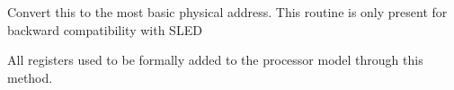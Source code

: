 
\begin{DoxyRefList}
\item[Member \mbox{\hyperlink{class_address_a5dfb849ac01e7b1ca87d0ecbf5022dca}{Address::to\+Physical}} (void)]\label{deprecated__deprecated000001}%
%
Convert this to the most basic physical address. This routine is only present for backward compatibility with S\+L\+ED  
\item[Member \mbox{\hyperlink{class_translate_a2614aefa5c03a9f1ed0b2dba794cad2c}{Translate::add\+Register}} (const string \&nm, \mbox{\hyperlink{class_addr_space}{Addr\+Space}} $\ast$base, uintb offset, int4 size)=0]\label{deprecated__deprecated000002}%
%
All registers used to be formally added to the processor model through this method. 
\end{DoxyRefList}